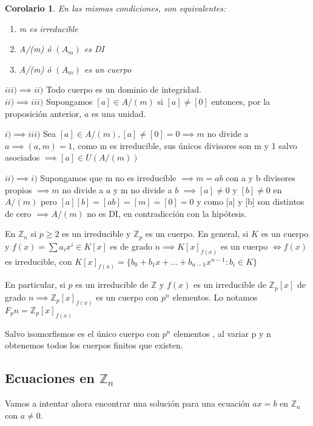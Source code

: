 \documentclass[11pt, a4paper, titlepage]{article}
\makeatletter
\newif\IfInSansMode
\let\oldsf\sffamily
\renewcommand*{\sffamily}{\oldsf\mathversion{sans}\InSansModetrue}
\let\oldnorm\normalfont
\renewcommand*{\normalfont}{\oldnorm\InSansModefalse\mathversion{normal}}
\renewenvironment{proof}[1][\proofname] {\vspace{-15pt}\par\pushQED{\qed}\normalfont\topsep6\p@\@plus6\p@\relax\trivlist\item[\hskip\labelsep\it#1\@addpunct{.}]\ignorespaces}{\popQED\endtrivlist\@endpefalse}
\providecommand{\ent}{\mathbb{Z}}
\renewenvironment{proof}[1][\proofname] {\par\pushQED{\qed}\normalfont\topsep6\p@\@plus6\p@\relax\trivlist\item[\hskip\labelsep\itshape\sffamily#1\@addpunct{.}]\ignorespaces}{\popQED\endtrivlist\@endpefalse}
\theoremstyle{theorem-style}
\newtheorem{ncor}{Corolario}[section]
\theoremstyle{definition-style}
\theoremstyle{remark-style}
\theoremstyle{example-style}
\newenvironment{nlist}
{\begin{enumerate}
\renewcommand\labelenumi{(\emph{\roman{enumi})}}}
{\end{enumerate}}
\makeatother
\begin{document}
\begin{ncor}
	En las mismas condiciones, son equivalentes:

	\begin{nlist}
	\item m es irreducible
	\item A/(m) ó $(A_m)$ es DI
	\item A/(m) ó $(A_m)$ es un cuerpo
\end{nlist}
\end{ncor}
\begin{proof}
	$\boxed{iii) \implies ii)}$ Todo cuerpo es un dominio de integridad.\\
	$\boxed{ii) \implies iii)}$ Supongamos $[a] \in A/(m) $ si $[a] \ne [0]$ entonces, por la proposición anterior, $a$ es una unidad.

	$\boxed{i) \implies iii)}$ Sea $[a] \in A/(m), [a] \ne [0] = 0 \implies m$ no divide a $a \implies (a,m) = 1$, como m es irreducible, sus únicos divisores son m y 1 salvo asociados $\implies [a] \in U(A/(m))$

	$\boxed{ii)\implies i)}$ Supongamos que m no es irreducible $\implies m = ab$ con a y b divisores propios $\implies m$ no divide a $a$ y m no divide a $b$ $\implies [a] \ne 0 $ y $[b] \ne 0$ en $A/(m)$ pero $[a][b] = [ab] = [m] = [0] = 0$ y como [a] y [b] son distintos de cero $\implies A/(m)$ no es DI, en contradicción con la hipótesis.
\end{proof}

En $\ent_n$ si $p \geq 2$ es un irreducible y $\ent_p $ es un cuerpo. En general, si $K$ es un cuerpo y $f(x) = \sum a_i x^i \in K[x]$ es de grado $n \implies K[x]_{f(x)}$
 es un cuerpo $\iff f(x)$ es irreducible, con $K[x]_{f(x)} = \{b_0 +b_1 x + ... + b_{n-1}x^{n-1} :  b_i \in K \}$


En particular, si $p$ es un irreducible de $\ent$ y $f(x)$ es un irreducible de $\ent_p[x]$ de grado $n \implies \ent_p[x]_{f(x)}$ es un cuerpo con $p^n$ elementos. Lo notamos $F_pn = \ent_p[x]_{f(x)}$

Salvo isomorfismos es el único cuerpo con $p^n$ elementos , al variar p y n obtenemos todos los cuerpos finitos que existen.
\subsection{Ecuaciones en $\ent_n$}

Vamos a intentar ahora encontrar una solución para una ecuación $ax = b$ en $\ent_n$ con $a \ne 0$.
\end{document}
